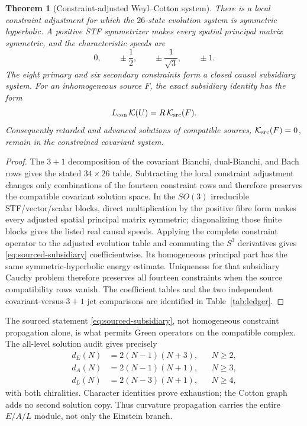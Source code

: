 \documentclass[11pt]{article}
\newtheorem{theorem}{Theorem}[section]
\theoremstyle{definition}
\theoremstyle{remark}
\begin{document}
\begin{theorem}[Constraint-adjusted Weyl--Cotton system]
\label{thm:WC}
There is a local constraint adjustment for which the $26$-state evolution
system is symmetric hyperbolic.  A positive STF symmetrizer makes every
spatial principal matrix symmetric, and the characteristic speeds are
\begin{equation}
 0,\qquad \pm\frac12,\qquad \pm\frac1{\sqrt3},\qquad \pm1.
\end{equation}
The eight primary and six secondary constraints form a closed causal
subsidiary system.  For an inhomogeneous source $F$, the exact subsidiary
identity has the form
\begin{equation}\label{eq:sourced-subsidiary}
 L_{\rm con}\,\mathcal K(U)
 =R\,\mathcal K_{\rm src}(F).
\end{equation}
Consequently retarded and advanced solutions of compatible sources,
$\mathcal K_{\rm src}(F)=0$, remain in the constrained covariant system.
\end{theorem}

\begin{proof}
The $3+1$ decomposition of the covariant Bianchi, dual-Bianchi, and Bach
rows gives the stated $34\times26$ table.  Subtracting the local constraint
adjustment changes only combinations of the fourteen constraint rows and
therefore preserves the compatible covariant solution space.  In the
$SO(3)$ irreducible STF/vector/scalar blocks, direct multiplication by the
positive fibre form makes every adjusted spatial principal matrix symmetric;
diagonalizing those finite blocks gives the listed real causal speeds.
Applying the complete constraint operator to the adjusted evolution table
and commuting the $S^3$ derivatives gives
\eqref{eq:sourced-subsidiary} coefficientwise.  Its homogeneous principal
part has the same symmetric-hyperbolic energy estimate.  Uniqueness for that
subsidiary Cauchy problem therefore preserves all fourteen constraints when
the source compatibility rows vanish.  The coefficient tables and the two
independent covariant-versus-$3+1$ jet comparisons are identified in
Table~\ref{tab:ledger}.
\end{proof}

The sourced statement \eqref{eq:sourced-subsidiary}, not homogeneous
constraint propagation alone, is what permits Green operators on the
compatible complex.  The all-level solution audit gives precisely
\begin{align}
 d_E(N)&=2(N-1)(N+3), &&N\geq2,\nonumber\\
 d_A(N)&=2(N-1)(N+1), &&N\geq3,\label{eq:EAL-multiplicity}\\
 d_L(N)&=2(N-3)(N+1), &&N\geq4,\nonumber
\end{align}
with both chiralities.  Character identities prove exhaustion; the Cotton
graph adds no second solution copy.  Thus curvature propagation carries the
entire $E/A/L$ module, not only the Einstein branch.
\end{document}
